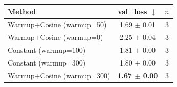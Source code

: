 \begin{tabular}{lcc}
\toprule
Method & val\_loss $\downarrow$ & $n$ \\
\midrule
Warmup+Cosine (warmup=50) & \underline{1.69 $\pm$ 0.01} & 3 \\
Warmup+Cosine (warmup=0) & 2.25 $\pm$ 0.04 & 3 \\
Constant (warmup=100) & 1.81 $\pm$ 0.00 & 3 \\
Constant (warmup=300) & 1.80 $\pm$ 0.00 & 3 \\
Warmup+Cosine (warmup=300) & \textbf{1.67 $\pm$ 0.00} & 3 \\
\bottomrule
\end{tabular}
